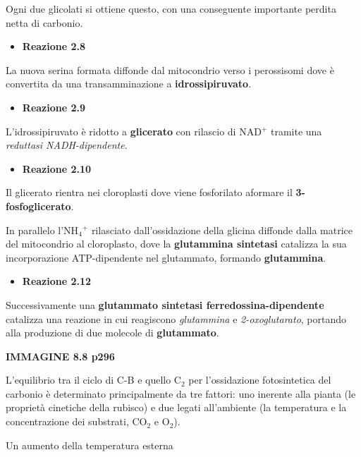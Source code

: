 \documentclass[]{article}
\begin{document}
Ogni due glicolati si ottiene questo, con una conseguente importante
perdita netta di carbonio.

\begin{itemize}
\itemsep1pt\parskip0pt
\item
  \textbf{Reazione 2.8}
\end{itemize}

La nuova serina formata diffonde dal mitocondrio verso i perossisomi
dove è convertita da una transamminazione a \textbf{idrossipiruvato}.

\begin{itemize}
\itemsep1pt\parskip0pt
\item
  \textbf{Reazione 2.9}
\end{itemize}

L'idrossipiruvato è ridotto a \textbf{glicerato} con rilascio di NAD$^+$
tramite una \emph{reduttasi NADH-dipendente}.

\begin{itemize}
\itemsep1pt\parskip0pt
\item
  \textbf{Reazione 2.10}
\end{itemize}

Il glicerato rientra nei cloroplasti dove viene fosforilato aformare il
\textbf{3-fosfoglicerato}.

In parallelo l'NH$_4$$^+$ rilasciato dall'ossidazione della glicina
diffonde dalla matrice del mitocondrio al cloroplasto, dove la
\textbf{glutammina sintetasi} catalizza la sua incorporazione
ATP-dipendente nel glutammato, formando \textbf{glutammina}.

\begin{itemize}
\itemsep1pt\parskip0pt
\item
  \textbf{Reazione 2.12}
\end{itemize}

Successivamente una \textbf{glutammato sintetasi
ferredossina-dipendente} catalizza una reazione in cui reagiscono
\emph{glutammina} e \emph{2-oxoglutarato}, portando alla produzione di
due molecole di \textbf{glutammato}.

\textbf{IMMAGINE 8.8 p296}

L'equilibrio tra il ciclo di C-B e quello C$_2$ per l'ossidazione
fotosintetica del carbonio è determinato principalmente da tre fattori:
uno inerente alla pianta (le proprietà cinetiche della rubisco) e due
legati all'ambiente (la temperatura e la concentrazione dei substrati,
CO$_2$ e O$_2$).

Un aumento della temperatura esterna
\end{document}
